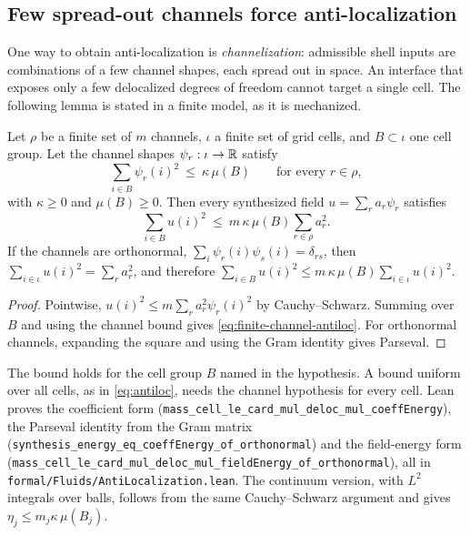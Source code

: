 \subsection{Few spread-out channels force anti-localization}

One way to obtain anti-localization is \emph{channelization}: admissible shell inputs are
combinations of a few channel shapes, each spread out in space. An interface that exposes only a
few delocalized degrees of freedom cannot target a single cell. The following lemma is stated in a
finite model, as it is mechanized.

\begin{lemma}\label{lem:channel-antiloc}
Let $\rho$ be a finite set of $m$ channels, $\iota$ a finite set of grid cells, and $B\subset\iota$
one cell group. Let the channel shapes $\psi_r:\iota\to\mathbb{R}$ satisfy
\[
\sum_{i\in B}\psi_r(i)^2\ \le\ \kappa\,\mu(B)\qquad\text{for every }r\in\rho,
\]
with $\kappa\ge0$ and $\mu(B)\ge0$. Then every synthesized field $u=\sum_r a_r\psi_r$ satisfies
\begin{equation}\label{eq:finite-channel-antiloc}
\sum_{i\in B}u(i)^2\ \le\ m\,\kappa\,\mu(B)\sum_{r\in\rho}a_r^2 .
\end{equation}
If the channels are orthonormal, $\sum_i\psi_r(i)\psi_s(i)=\delta_{rs}$, then
$\sum_{i\in\iota}u(i)^2=\sum_ra_r^2$, and therefore
$\sum_{i\in B}u(i)^2\le m\,\kappa\,\mu(B)\sum_{i\in\iota}u(i)^2$.
\end{lemma}

\begin{proof}
Pointwise, $u(i)^2\le m\sum_r a_r^2\psi_r(i)^2$ by Cauchy--Schwarz. Summing over $B$ and using the
channel bound gives \eqref{eq:finite-channel-antiloc}. For orthonormal channels, expanding the square
and using the Gram identity gives Parseval.
\end{proof}

The bound holds for the cell group $B$ named in the hypothesis. A bound uniform over all cells, as
in \eqref{eq:antiloc}, needs the channel hypothesis for every cell. Lean proves the coefficient
form (\nolinkurl{mass_cell_le_card_mul_deloc_mul_coeffEnergy}), the Parseval identity from the Gram
matrix (\nolinkurl{synthesis_energy_eq_coeffEnergy_of_orthonormal}) and the field-energy form
(\nolinkurl{mass_cell_le_card_mul_deloc_mul_fieldEnergy_of_orthonormal}), all in
\nolinkurl{formal/Fluids/AntiLocalization.lean}. The continuum version, with $L^2$ integrals over
balls, follows from the same Cauchy--Schwarz argument and gives $\eta_j\le m_j\kappa\,\mu(B_j)$.

